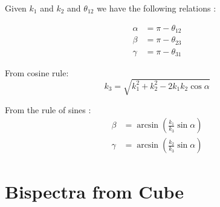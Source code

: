 Given $k_1$ and $k_2$ and $\theta_{12}$ we have the following relations :

\begin{equation}
  \begin{split}
    \alpha &= \pi-\theta_{12}\\
    \beta &= \pi-\theta_{23}\\
    \gamma &= \pi-\theta_{31}
  \end{split}
\end{equation}

From cosine rule:
\begin{equation}
  k_3 = \sqrt{k_1^2 + k_2^2 - 2k_1k_2\cos\alpha}
\end{equation}

From the rule of sines :
\begin{equation}
  \begin{split}
    \beta &= \arcsin\left(\frac{k_1}{k_3}\sin\alpha\right)\\
    \gamma &= \arcsin\left(\frac{k_2}{k_3}\sin\alpha\right)
  \end{split}
\end{equation}


\section{Bispectra from Cube}

